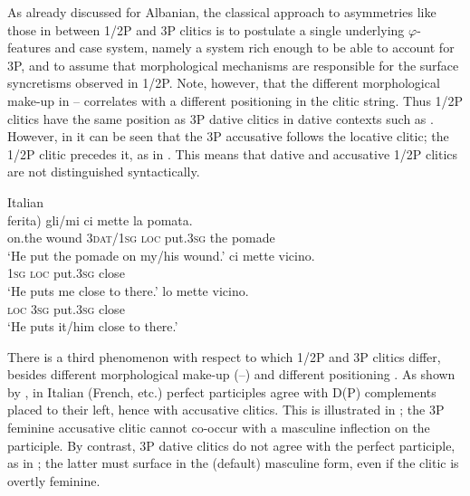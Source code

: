 \documentclass[output=paper,colorlinks,citecolor=brown,modfonts,nonflat]{langsci/langscibook}
\begin{document}
\largerpage[2]
As already discussed for Albanian, the classical approach to asymmetries like those in  between 1/2P and 3P clitics is to postulate a single underlying $\varphi ${}-features and case system, namely a system rich enough to be able to account for 3P, and to assume that morphological mechanisms are responsible for the surface syncretisms observed in 1/2P. Note, however, that the different morphological make-up in -- correlates with a different positioning in the clitic string. Thus 1/2P clitics have the same position as 3P dative clitics in dative contexts such as . However, in  it can be seen that the 3P accusative follows the locative clitic; the 1/2P clitic precedes it, as in . This means that dative and accusative 1/2P clitics are not distinguished syntactically.

\ea%
    \label{ex:manzini:13}
    Italian\\
    \ea\label{ex:manzini:13a}
     {ferita)}   {gli/mi}    {ci}   {mette} {la} {pomata}.\\
        on.the wound   \textsc{3dat/1sg}   \textsc{loc}   put.\textsc{3sg} the pomade\\
    \glt ‘He put the pomade on my/his wound.’
    \ex\label{ex:manzini:13b}
      {ci}   {mette}   {vicino}.\\
        \textsc{1sg}  \textsc{loc}  put.\textsc{3sg} close\\
    \glt ‘He puts me close to there.’
    \ex\label{ex:manzini:13c}
      {lo}  {mette}   {vicino}.\\
        \textsc{loc}  \textsc{3sg}   put.\textsc{3sg} close\\
    \glt ‘He puts it/him close to there.’
    \z
\z

There is a third phenomenon with respect to which 1/2P and 3P clitics differ, besides different morphological make-up (--) and different positioning . As shown by \citet{Kayne1989}, in Italian (French, etc.) perfect participles agree with D(P) complements placed to their left, hence with accusative clitics. This is illustrated in ; the 3P feminine accusative clitic cannot co-occur with a masculine inflection on the participle. By contrast, 3P dative clitics do not agree with the perfect participle, as in ; the latter must surface in the (default) masculine form, even if the clitic is overtly feminine.
\end{document}
